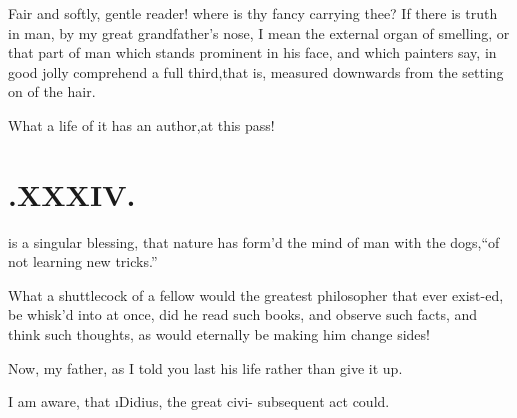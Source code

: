 \documentclass[twoside]{article}
\begin{document}
\tsh Fair and softly, gentle reader!\break
\tsh where is thy fancy carrying thee?\break
\tsh If there is truth in man, by my
great grandfather’s nose, I mean the external organ of smelling,
or that part of man which stands prominent in his
face,
\tsk and which painters say, in good jolly\break
{}\break
comprehend a full third,\tsh that is, measured
downwards from the setting on of the hair.\tsh

\tsh What a life of it has an author,\break at this pass!

\section{.\quad  XXXIV.}

 is a singular blessing, that nature\break
has form’d the mind of man with the \break
{}
dogs,\tsk “of not learning new tricks.”

What a shuttlecock of a fellow would the greatest philosopher
that ever exist-\break ed, be whisk’d into at once, did he read
such books, and observe such facts, and think such thoughts, as
would eternally be making him change sides!

Now, my father, as I told you last\break 
{} 
his life rather than give it up.\tsh

I am aware, that \i{Didius}, the great civi-
subsequent act could.
\end{document}
